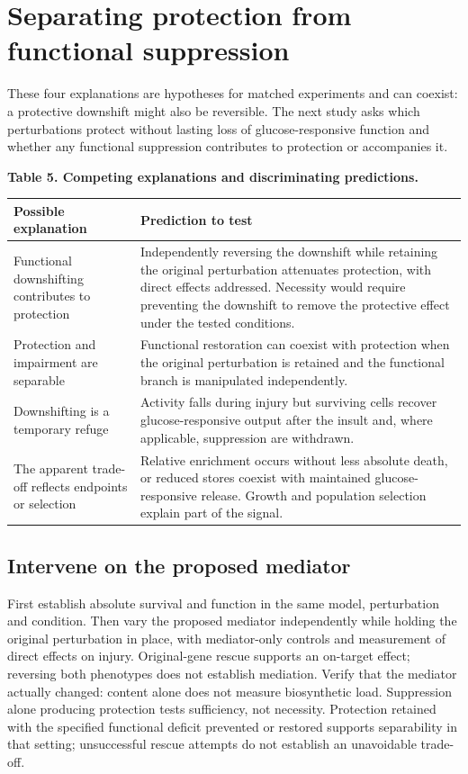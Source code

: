 \documentclass[10pt,letterpaper]{article}
\begin{document}
\clearpage
\section*{Separating protection from functional suppression}
These four explanations are hypotheses for matched experiments and can coexist: a protective downshift might also be reversible. The next study asks which perturbations protect without lasting loss of glucose-responsive function and whether any functional suppression contributes to protection or accompanies it.

{\small\textbf{Table 5. Competing explanations and discriminating predictions.}\par}
{\small\begin{longtable}{>{\raggedright\arraybackslash}p{1.55in}>{\raggedright\arraybackslash}p{4.37in}}\toprule
\textbf{Possible explanation} & \textbf{Prediction to test}\\\midrule\endhead
Functional downshifting contributes to protection & Independently reversing the downshift while retaining the original perturbation attenuates protection, with direct effects addressed. Necessity would require preventing the downshift to remove the protective effect under the tested conditions.\\
Protection and impairment are separable & Functional restoration can coexist with protection when the original perturbation is retained and the functional branch is manipulated independently.\\
Downshifting is a temporary refuge & Activity falls during injury but surviving cells recover glucose-responsive output after the insult and, where applicable, suppression are withdrawn.\\
The apparent trade-off reflects endpoints or selection & Relative enrichment occurs without less absolute death, or reduced stores coexist with maintained glucose-responsive release. Growth and population selection explain part of the signal.\\
\bottomrule\end{longtable}}
\subsection*{Intervene on the proposed mediator}
First establish absolute survival and function in the same model, perturbation and condition. Then vary the proposed mediator independently while holding the original perturbation in place, with mediator-only controls and measurement of direct effects on injury. Original-gene rescue supports an on-target effect; reversing both phenotypes does not establish mediation. Verify that the mediator actually changed: content alone does not measure biosynthetic load. Suppression alone producing protection tests sufficiency, not necessity. Protection retained with the specified functional deficit prevented or restored supports separability in that setting; unsuccessful rescue attempts do not establish an unavoidable trade-off.
\end{document}
